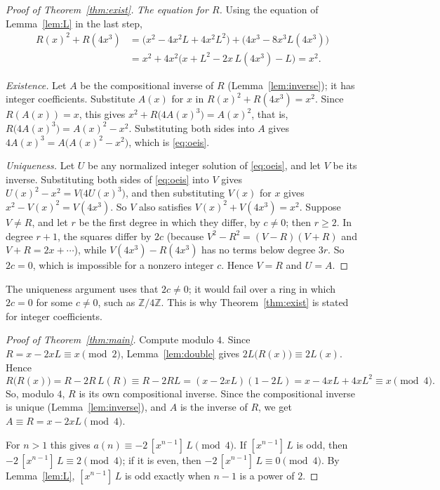 \documentclass[11pt,a4paper]{article}
\theoremstyle{definition}
\theoremstyle{remark}
\newcommand{\Z}{\mathbb{Z}}
\newcommand{\coeff}[2]{[x^{#1}]\,#2}
\begin{document}
\begin{proof}[Proof of Theorem~\ref{thm:exist}]
\emph{The equation for $R$.} Using the equation of Lemma~\ref{lem:L} in the last step,
\begin{align*}
R(x)^2+R(4x^3)&=\bigl(x^2-4x^2L+4x^2L^2\bigr)+\bigl(4x^3-8x^3L(4x^3)\bigr)\\
&=x^2+4x^2\bigl(x+L^2-2x\,L(4x^3)-L\bigr)=x^2 .
\end{align*}

\emph{Existence.} Let $A$ be the compositional inverse of $R$ (Lemma~\ref{lem:inverse}); it has integer coefficients.
Substitute $A(x)$ for $x$ in $R(x)^2+R(4x^3)=x^2$. Since $R(A(x))=x$, this gives $x^2+R\bigl(4A(x)^3\bigr)=A(x)^2$, that is,
$R\bigl(4A(x)^3\bigr)=A(x)^2-x^2$. Substituting both sides into $A$ gives $4A(x)^3=A\bigl(A(x)^2-x^2\bigr)$, which is
\eqref{eq:oeis}.

\emph{Uniqueness.} Let $U$ be any normalized integer solution of \eqref{eq:oeis}, and let $V$ be its inverse.
Substituting both sides of \eqref{eq:oeis} into $V$ gives $U(x)^2-x^2=V\bigl(4U(x)^3\bigr)$, and then substituting $V(x)$ for $x$ gives
$x^2-V(x)^2=V(4x^3)$. So $V$ also satisfies $V(x)^2+V(4x^3)=x^2$. Suppose $V\ne R$, and let $r$ be the first degree in
which they differ, by $c\ne0$; then $r\ge2$. In degree $r+1$, the squares differ by $2c$ (because
$V^2-R^2=(V-R)(V+R)$ and $V+R=2x+\cdots$), while $V(4x^3)-R(4x^3)$ has no terms below degree $3r$. So $2c=0$, which is
impossible for a nonzero integer $c$. Hence $V=R$ and $U=A$.
\end{proof}

The uniqueness argument uses that $2c\ne0$; it would fail over a ring in which $2c=0$ for some $c\neq0$, such as
$\Z/4\Z$. This is why Theorem~\ref{thm:exist} is stated for integer coefficients.

\begin{proof}[Proof of Theorem~\ref{thm:main}]
Compute modulo $4$. Since $R=x-2xL\equiv x\pmod 2$, Lemma~\ref{lem:double} gives $2L\bigl(R(x)\bigr)\equiv2L(x)$. Hence
\[
R\bigl(R(x)\bigr)=R-2R\,L(R)\equiv R-2RL=(x-2xL)(1-2L)=x-4xL+4xL^2\equiv x\pmod 4 .
\]
So, modulo $4$, $R$ is its own compositional inverse. Since the compositional inverse is unique
(Lemma~\ref{lem:inverse}), and $A$ is the inverse of $R$, we get $A\equiv R=x-2xL\pmod 4$.

For $n>1$ this gives $a(n)\equiv-2\,\coeff{n-1}{L}\pmod 4$. If $\coeff{n-1}{L}$ is odd, then
$-2\,\coeff{n-1}{L}\equiv2\pmod4$; if it is even, then $-2\,\coeff{n-1}{L}\equiv0\pmod 4$. By Lemma~\ref{lem:L},
$\coeff{n-1}{L}$ is odd exactly when $n-1$ is a power of $2$.
\end{proof}
\end{document}
